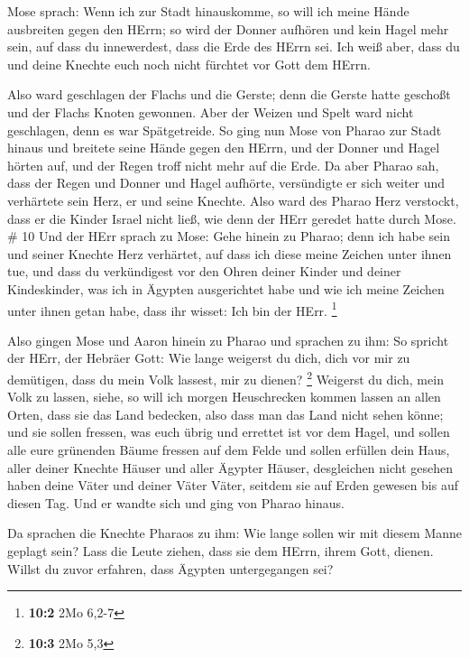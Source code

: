  Mose sprach: Wenn ich zur Stadt hinauskomme, so will ich
meine Hände ausbreiten gegen den HErrn; so wird der Donner aufhören und
kein Hagel mehr sein, auf dass du innewerdest, dass die Erde des HErrn
sei.  Ich weiß aber, dass du und deine Knechte euch noch
nicht fürchtet vor Gott dem HErrn.

 Also ward geschlagen der Flachs und die Gerste; denn die
Gerste hatte geschoßt und der Flachs Knoten gewonnen.  Aber
der Weizen und Spelt ward nicht geschlagen, denn es war Spätgetreide.
 So ging nun Mose von Pharao zur Stadt hinaus und breitete
seine Hände gegen den HErrn, und der Donner und Hagel hörten auf, und
der Regen troff nicht mehr auf die Erde.  Da aber Pharao
sah, dass der Regen und Donner und Hagel aufhörte, versündigte er sich
weiter und verhärtete sein Herz, er und seine Knechte. 
Also ward des Pharao Herz verstockt, dass er die Kinder Israel nicht
ließ, wie denn der HErr geredet hatte durch Mose. \# 10  Und
der HErr sprach zu Mose: Gehe hinein zu Pharao; denn ich habe sein und
seiner Knechte Herz verhärtet, auf dass ich diese meine Zeichen unter
ihnen tue,  und dass du verkündigest vor den Ohren deiner
Kinder und deiner Kindeskinder, was ich in Ägypten ausgerichtet habe und
wie ich meine Zeichen unter ihnen getan habe, dass ihr wisset: Ich bin
der HErr. \footnote{\textbf{10:2} 2Mo 6,2-7}

 Also gingen Mose und Aaron hinein zu Pharao und sprachen zu
ihm: So spricht der HErr, der Hebräer Gott: Wie lange weigerst du dich,
dich vor mir zu demütigen, dass du mein Volk lassest, mir zu dienen?
\footnote{\textbf{10:3} 2Mo 5,3}  Weigerst du dich, mein
Volk zu lassen, siehe, so will ich morgen Heuschrecken kommen lassen an
allen Orten,  dass sie das Land bedecken, also dass man das
Land nicht sehen könne; und sie sollen fressen, was euch übrig und
errettet ist vor dem Hagel, und sollen alle eure grünenden Bäume fressen
auf dem Felde  und sollen erfüllen dein Haus, aller deiner
Knechte Häuser und aller Ägypter Häuser, desgleichen nicht gesehen haben
deine Väter und deiner Väter Väter, seitdem sie auf Erden gewesen bis
auf diesen Tag. Und er wandte sich und ging von Pharao hinaus.

 Da sprachen die Knechte Pharaos zu ihm: Wie lange sollen
wir mit diesem Manne geplagt sein? Lass die Leute ziehen, dass sie dem
HErrn, ihrem Gott, dienen. Willst du zuvor erfahren, dass Ägypten
untergegangen sei?

